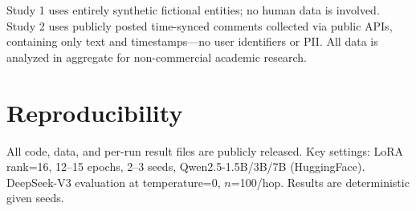 \documentclass[11pt]{article}
\begin{document}
Study 1 uses entirely synthetic fictional entities; no human data is involved. Study 2 uses publicly posted time-synced comments collected via public APIs, containing only text and timestamps---no user identifiers or PII. All data is analyzed in aggregate for non-commercial academic research.

\section{Reproducibility}

All code, data, and per-run result files are publicly released. Key settings: LoRA rank=16, 12--15 epochs, 2--3 seeds, Qwen2.5-1.5B/3B/7B (HuggingFace). DeepSeek-V3 evaluation at temperature=0, $n$=100/hop. Results are deterministic given seeds.


\end{document}

